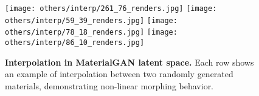 \setlength{\resLen}{.95\columnwidth}
\begin{figure}[tb]
	\centering
	\texttt{[image: others/interp/261\_76\_renders.jpg]}
	\texttt{[image: others/interp/59\_39\_renders.jpg]}
	\texttt{[image: others/interp/78\_18\_renders.jpg]}
	\texttt{[image: others/interp/86\_10\_renders.jpg]}
	\caption{\label{fig:fakemorph}
		\textbf{Interpolation in MaterialGAN latent space.} Each row shows an example of interpolation between two randomly generated materials, demonstrating non-linear morphing behavior.
	}
\end{figure}
